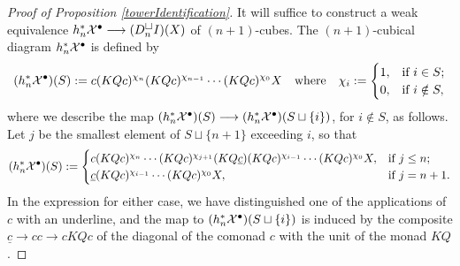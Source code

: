 \documentclass[11pt]{amsart}
\theoremstyle{plain}
\begin{document}
\begin{proof}[Proof of Proposition \ref{towerIdentification}] 
It will suffice to construct a weak equivalence $h_n^*\mathcal{X}^\bullet\longrightarrow (D_n^{\smash{\square}}I)(X)$ of $(n+1)$-cubes. The $(n+1)$-cubical diagram $h_n^*\mathcal{X}^\bullet$ is defined by
\[(h_n^*\mathcal{X}^\bullet)(S):= c(KQc)^{\chi_{n}}(KQc)^{\chi_{n-1}}\cdots (KQc)^{\chi_0}X\quad \textup{where}\quad \chi_i:=\begin{cases}
1,&\textup{if }i\in S;\\
0,&\textup{if }i\notin S,
\end{cases}
\]
where we describe the map $(h_n^*\mathcal{X}^\bullet)(S)\longrightarrow (h_n^*\mathcal{X}^\bullet)(S\sqcup\{i\})$, for $i\notin S$, as follows. Let $j$ be the smallest element of $S\sqcup\{n+1\}$ exceeding $i$, so that
\[(h_n^*\mathcal{X}^\bullet)(S):= \begin{cases}
c(KQc)^{\chi_{n}}\cdots (KQc)^{\chi_{j+1}}(KQ\underline{c})(KQc)^{\chi_{i-1}}\cdots (KQc)^{\chi_0}X,&\textup{if }j\leq n;\\
\underline{c}(KQc)^{\chi_{i-1}}\cdots (KQc)^{\chi_0}X,&\textup{if }j=n+1.
\end{cases}
\]
In the expression for either case, we have distinguished one of the applications of $c$ with an underline, and the map to $(h_n^*\mathcal{X}^\bullet)(S\sqcup\{i\})$ is induced by the composite $\underline{c}\to cc\to cKQc$ of the diagonal of the comonad $c$ with the unit of the monad $KQ$. %



\end{proof}
\end{document}

